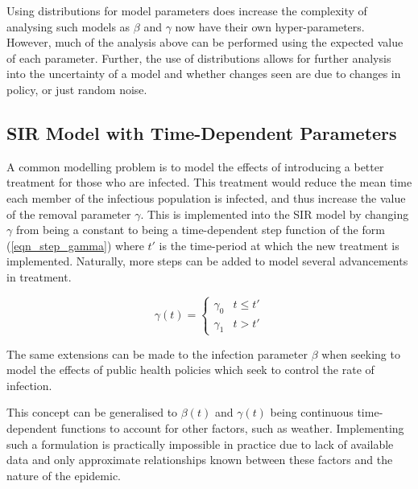 \documentclass[11pt,a4paper]{article}
\theoremstyle{break}
\begin{document}
  \par Using distributions for model parameters does increase the complexity of analysing such models as $\beta$ and $\gamma$ now have their own hyper-parameters. However, much of the analysis above can be performed using the expected value of each parameter. Further, the use of distributions allows for further analysis into the uncertainty of a model and whether changes seen are due to changes in policy, or just random noise.

\subsection*{SIR Model with Time-Dependent Parameters}

  \par A common modelling problem is to model the effects of introducing a better treatment for those who are infected. This treatment would reduce the mean time each member of the infectious population is infected, and thus increase the value of the removal parameter $\gamma$. This is implemented into the SIR model by changing $\gamma$ from being a constant to being a time-dependent step function of the form (\ref{eqn_step_gamma}) where $t'$ is the time-period at which the new treatment is implemented. Naturally, more steps can be added to model several advancements in treatment.

  \begin{equation}\label{eqn_step_gamma}
    \gamma(t)=\begin{cases}
      \gamma_0&t\leq t'\\
      \gamma_1&t>t'
    \end{cases}
  \end{equation}

  \par The same extensions can be made to the infection parameter $\beta$ when seeking to model the effects of public health policies which seek to control the rate of infection.

  \par This concept can be generalised to $\beta(t)$ and $\gamma(t)$ being continuous time-dependent functions to account for other factors, such as weather. Implementing such a formulation is practically impossible in practice due to lack of available data and only approximate relationships known between these factors and the nature of the epidemic.
\end{document}

